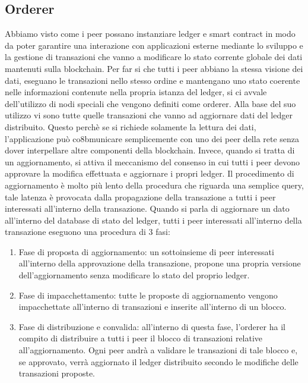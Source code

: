 \subsection{Orderer}
Abbiamo visto come i peer possano instanziare ledger e smart contract in modo da poter garantire una interazione con applicazioni esterne mediante lo sviluppo e la gestione di transazioni che vanno a modificare lo stato corrente globale dei dati mantenuti sulla blockchain. Per far si che tutti i peer abbiano la stessa visione dei dati, eseguano le transazioni nello stesso ordine e mantengano uno stato coerente nelle informazioni contenute nella propria istanza del ledger, si ci avvale dell'utilizzo di nodi speciali che vengono definiti come orderer.
Alla base del suo utilizzo vi sono tutte quelle transazioni che vanno ad aggiornare dati del ledger distribuito. Questo perchè se si richiede solamente la lettura dei dati, l'applicazione può co8bmunicare semplicemente con uno dei peer della rete senza dover interpellare altre componenti della blockchain. Invece, quando si tratta di un aggiornamento, si attiva il meccanismo del consenso in cui tutti i peer devono approvare la modifica effettuata e aggiornare i propri ledger. Il procedimento di aggiornamento è molto più lento della procedura che riguarda una semplice query, tale latenza è provocata dalla propagazione della transazione a tutti i peer interessati all'interno della transazione.
Quando si parla di aggiornare un dato all'interno del database di stato del ledger, tutti i peer interessati all'interno della transazione eseguono una procedura di 3 fasi:
\newpage
\begin{enumerate}
    \item Fase di proposta di aggiornamento: un sottoinsieme di peer interessati all'interno della approvazione della transazione, propone una propria versione dell'aggiornamento senza modificare lo stato del proprio ledger.
    \item Fase di impacchettamento: tutte le proposte di aggiornamento vengono impacchettate all'interno di transazioni e inserite all'interno di un blocco. 
    \item Fase di distribuzione e convalida: all'interno di questa fase, l'orderer ha il compito di distribuire a tutti i peer il blocco di transazioni relative all'aggiornamento. Ogni peer andrà a validare le transazioni di tale blocco e, se approvato, verrà aggiornato il ledger distribuito secondo le modifiche delle transazioni proposte. 
\end{enumerate}
